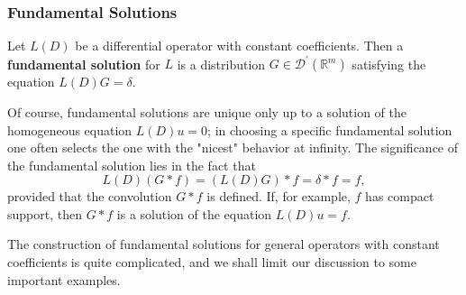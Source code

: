 \subsubsection{Fundamental Solutions}\label{subsec:fundamental-solutions}

\begin{Definition}
\label{def:fundamental-solution}
Let $L(D)$ be a differential operator with constant coefficients. Then a \textbf{fundamental solution} for $L$ is a distribution $G\in\mathcal{D}^{\prime}(\mathbb{R}^m)$ satisfying the equation $L(D)G=\delta$.
\end{Definition}

Of course, fundamental solutions are unique only up to a solution of the homogeneous equation $L(D)u=0$; in choosing a specific fundamental solution one often selects the one with the "nicest" behavior at infinity. The significance of the fundamental solution lies in the fact that
\begin{equation}\label{eq:fundamental-solution-convolution-identity}
L(D)(G*f)=(L(D)G)*f=\delta*f=f,
\end{equation}
provided that the convolution $G*f$ is defined. If, for example, $f$ has compact support, then $G*f$ is a solution of the equation $L(D)u=f$.

The construction of fundamental solutions for general operators with constant coefficients is quite complicated, and we shall limit our discussion to some important examples.

